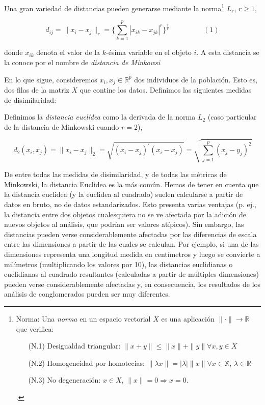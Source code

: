 Una gran variedad de distancias pueden generarse mediante la norma\footnote[10]{Norma: Una \textit{norma} en un espacio vectorial $X$ es una aplicación $\|\cdot\| \rightarrow \mathbb{R}$ que verifica:
\begin{itemize}
    \item[(N.1)] Desigualdad triangular: $\|x+y\| \leq \|x\| + \|y\| \forall x,y \in X$
    \item[(N.2)] Homogeneidad por homotecias: $\|\lambda x\| = |\lambda| \|x\| \forall x \in \mathbb{X}$, $\lambda \in \mathbb{R}$
    \item[(N.3)] No degeneración: $x \in X$, $\|x\| = 0 \Rightarrow x = 0$.\cite{def-norma}  
\end{itemize}.} $L_{r}$, $r \geq 1$, 


\[
d_{ij} = \|x_{i} - x_{j}\|_{r} = \{\sum_{k=1}^{p} |x_{ik}-x_{jk}|^{r}\}^{\frac{1}{r}} \hspace{2cm} (1)
\]

donde $x_{ik}$ denota el valor de la $k$-ésima variable en el objeto $i$. A esta distancia se la conoce por el nombre de \textit{distancia de Minkowsi}\newline

En lo que sigue, consideremos $x_{i}, x_{j} \in \mathbb{R}^{p}$ dos individuos de la población. Esto es, dos filas de la matriz $X$ que contine los datos. 
Definimos las siguientes medidas de disimilaridad:

\begin{definicion}

Definimos la \textit{distancia euclídea} como la derivada de la norma $L_{2}$ (caso particular de la distancia de Minkowski cuando $r=2$), 

\[
d_{2}(x_{i},x_{j}) = \|x_{i} - x_{j}\|_{2} = \sqrt{(x_{i}-x_{j})^{'}(x_{i}-x_{j})} = \sqrt{\sum_{j=1}^{p}(x_{j}-y_{j})^{2}}
\] 

\end{definicion}


De entre todas las medidas de disimilaridad, y de todas las métricas de Minkowski, la distancia Euclidea es la más común. Hemos de tener en cuenta que la 
distancia euclidea (y la euclidea al cuadrado) suelen calcularse a partir de datos en bruto, 
no de datos estandarizados. Esto presenta varias ventajas (p. ej., la distancia entre dos objetos cualesquiera no se ve afectada por la adición de nuevos objetos 
al análisis, que podrían ser valores atípicos). Sin embargo, las distancias pueden verse considerablemente afectadas por las diferencias de escala entre las 
dimensiones a partir de las cuales se calculan.  Por ejemplo, si una de las dimensiones representa una longitud medida en centímetros y luego se convierte a milímetros (multiplicando los 
valores por 10), las distancias euclidianas o euclidianas al cuadrado resultantes (calculadas a partir de múltiples dimensiones) pueden verse considerablemente 
afectadas y, en consecuencia, los resultados de los análisis de conglomerados pueden ser muy diferentes. \newline


